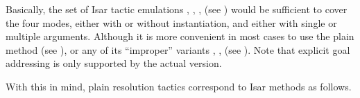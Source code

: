 \begin{isabellebody}
\begin{isamarkuptext}
\begin{enumerate}
  \end{enumerate}

  Basically, the set of Isar tactic emulations \hyperlink{method.rule-tac}{\mbox{}},
  \hyperlink{method.erule-tac}{\mbox{}}, \hyperlink{method.drule-tac}{\mbox{}}, \hyperlink{method.frule-tac}{\mbox{}} (see
  ) would be sufficient to cover the four modes,
  either with or without instantiation, and either with single or
  multiple arguments.  Although it is more convenient in most cases to
  use the plain \hyperlink{method.rule}{\mbox{}} method (see
  ), or any of its ``improper'' variants
  \hyperlink{method.erule}{\mbox{}}, \hyperlink{method.drule}{\mbox{}}, \hyperlink{method.frule}{\mbox{}} (see
  ).  Note that explicit goal addressing is
  only supported by the actual \hyperlink{method.rule-tac}{\mbox{}} version.

  With this in mind, plain resolution tactics correspond to Isar
  methods as follows.


\end{isamarkuptext}
\end{isabellebody}
